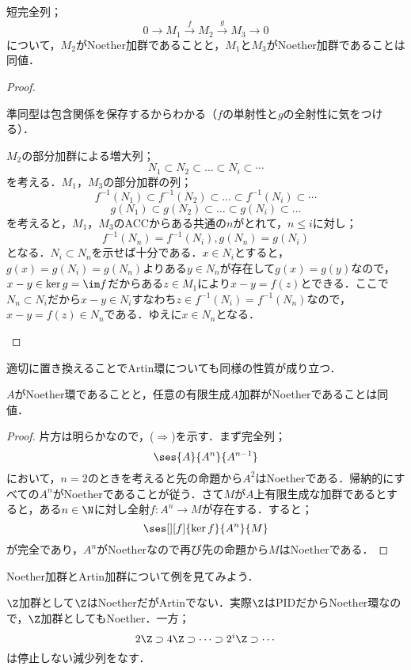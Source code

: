 \begin{prop}
	短完全列；
	\[0\longrightarrow M_1\overset{f}{\longrightarrow}M_2\overset{g}{\longrightarrow}M_3\longrightarrow0\]
	について，$M_2$がNoether加群であることと，$M_1$と$M_3$がNoether加群であることは同値．
\end{prop}
\begin{proof}
	\begin{eqv}
		\item 準同型は包含関係を保存するからわかる（$f$の単射性と$g$の全射性に気をつける）．
		\item $M_2$の部分加群による増大列；
		\[N_1\subset N_2\subset\dots\subset N_i\subset\cdots\]
		を考える．$M_1，M_3$の部分加群の列；
		\[f^{-1}(N_1)\subset f^{-1}(N_2)\subset\dots\subset f^{-1}(N_i)\subset\cdots\]
		\[g(N_1)\subset g(N_2)\subset\dots\subset g(N_i)\subset\dots\]
		を考えると，$M_1，M_3$のACCからある共通の$n$がとれて，$n\leq i$に対し；
		\[f^{-1}(N_n)=f^{-1}(N_i), g(N_n)=g(N_i)\]
		となる．$N_i\subset N_n$を示せば十分である．$x\in N_i$とすると，$g(x)=g(N_i)=g(N_n)$よりある$y\in N_n$が存在して$g(x)=g(y)$なので，$x-y\in\ker g=\im f$だからある$z\in M_1$により$x-y=f(z)$とできる．ここで$N_n\subset N_i$だから$x-y\in N_i$すなわち$z\in f^{-1}(N_i)=f^{-1}(N_n)$なので，$x-y=f(z)\in N_n$である．ゆえに$x\in N_n$となる．
	\end{eqv}
\end{proof}

適切に置き換えることでArtin環についても同様の性質が成り立つ．
\begin{prop}
	$A$がNoether環であることと，任意の有限生成$A$加群がNoetherであることは同値．
\end{prop}
\begin{proof}
		片方は明らかなので，($\Longrightarrow$)を示す．まず完全列；
		\[\ses{A}{A^n}{A^{n-1}}\]
		において，$n=2$のときを考えると先の命題から$A^2$はNoetherである．帰納的にすべての$A^n$がNoetherであることが従う．さて$M$が$A$上有限生成な加群であるとすると，ある$n\in\N$に対し全射$f:A^n\to M$が存在する．すると；
		\[\ses[][f]{\ker f}{A^n}{M}\]
		が完全であり，$A^n$がNoetherなので再び先の命題から$M$はNoetherである．
\end{proof}

Noether加群とArtin加群について例を見てみよう．

\begin{ex}
	$\Z$加群として$\Z$はNoetherだがArtinでない．実際$\Z$はPIDだからNoether環なので，$\Z$加群としてもNoether．一方；
	\[2\Z\supset4\Z\supset\dots\supset2^i\Z\supset\cdots\]
	は停止しない減少列をなす．
\end{ex}	


